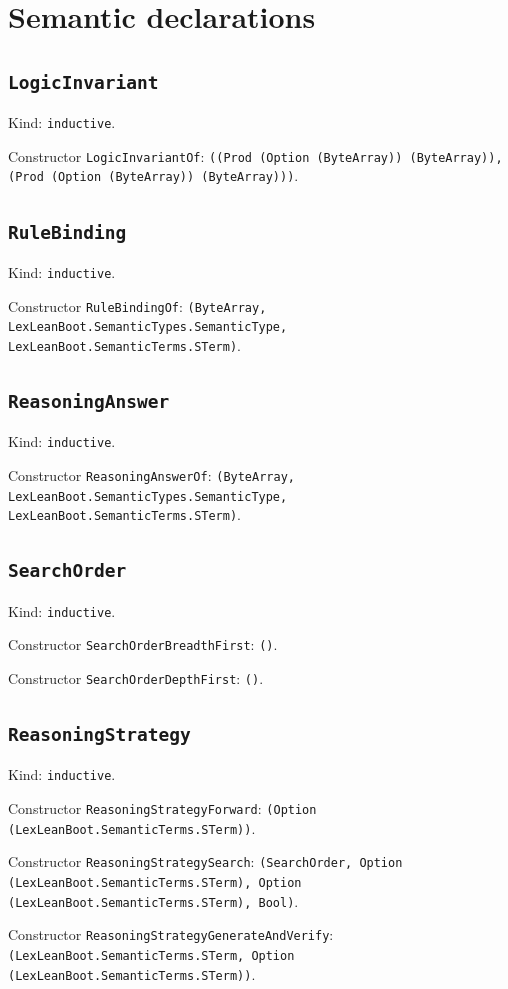 \documentclass[11pt]{article}
\begin{document}
\section*{Semantic declarations}
\subsection*{\texttt{LogicInvariant}}
\noindent Kind: \texttt{inductive}.\par
\noindent Constructor \texttt{LogicInvariantOf}: \texttt{((Prod (Option (ByteArray)) (ByteArray)), (Prod (Option (ByteArray)) (ByteArray)))}.\par
\subsection*{\texttt{RuleBinding}}
\noindent Kind: \texttt{inductive}.\par
\noindent Constructor \texttt{RuleBindingOf}: \texttt{(ByteArray, LexLeanBoot.SemanticTypes.SemanticType, LexLeanBoot.SemanticTerms.STerm)}.\par
\subsection*{\texttt{ReasoningAnswer}}
\noindent Kind: \texttt{inductive}.\par
\noindent Constructor \texttt{ReasoningAnswerOf}: \texttt{(ByteArray, LexLeanBoot.SemanticTypes.SemanticType, LexLeanBoot.SemanticTerms.STerm)}.\par
\subsection*{\texttt{SearchOrder}}
\noindent Kind: \texttt{inductive}.\par
\noindent Constructor \texttt{SearchOrderBreadthFirst}: \texttt{()}.\par
\noindent Constructor \texttt{SearchOrderDepthFirst}: \texttt{()}.\par
\subsection*{\texttt{ReasoningStrategy}}
\noindent Kind: \texttt{inductive}.\par
\noindent Constructor \texttt{ReasoningStrategyForward}: \texttt{(Option (LexLeanBoot.SemanticTerms.STerm))}.\par
\noindent Constructor \texttt{ReasoningStrategySearch}: \texttt{(SearchOrder, Option (LexLeanBoot.SemanticTerms.STerm), Option (LexLeanBoot.SemanticTerms.STerm), Bool)}.\par
\noindent Constructor \texttt{ReasoningStrategyGenerateAndVerify}: \texttt{(LexLeanBoot.SemanticTerms.STerm, Option (LexLeanBoot.SemanticTerms.STerm))}.\par
\end{document}
